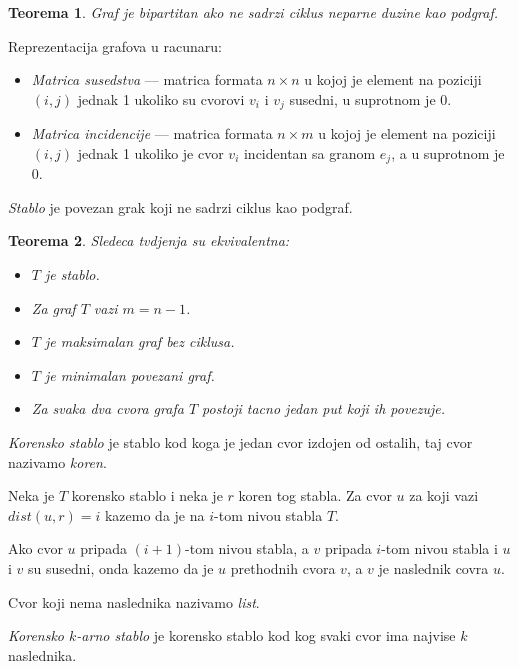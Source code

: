 \documentclass[12p, a4paper]{article}
\newtheorem*{theorem}{Teorema}
\begin{document}
\begin{multicols}{2}
    \begin{theorem}
        Graf je bipartitan ako ne sadrzi ciklus neparne duzine kao podgraf.
    \end{theorem}

    Reprezentacija grafova u racunaru:
    \begin{itemize}
        \itemsep0em
        \item \emph{Matrica susedstva} --- matrica formata $n \times n$ u
              kojoj je element na poziciji $(i, j)$ jednak 1 ukoliko su
              cvorovi $v_i$ i $v_j$ susedni, u suprotnom je 0.
        \item \emph{Matrica incidencije} --- matrica formata $n \times m$ u
              kojoj je element na poziciji $(i, j)$ jednak 1 ukoliko je
              cvor $v_i$ incidentan sa granom $e_j$, a u suprotnom je 0.
    \end{itemize}

    \emph{Stablo} je povezan grak koji ne sadrzi ciklus kao podgraf.

    \begin{theorem}
        Sledeca tvdjenja su ekvivalentna:
        \begin{itemize}
            \itemsep0em
            \item $T$ je stablo.
            \item Za graf $T$ vazi $m = n - 1$.
            \item $T$ je maksimalan graf bez ciklusa.
            \item $T$ je minimalan povezani graf.
            \item Za svaka dva cvora grafa $T$ postoji tacno jedan put koji ih
                  povezuje.
        \end{itemize}
    \end{theorem}

    \emph{Korensko stablo} je stablo kod koga je jedan cvor izdojen od ostalih,
    taj cvor nazivamo \emph{koren}.

    Neka je $T$ korensko stablo i neka je $r$ koren tog stabla. Za cvor $u$
    za koji vazi $dist(u, r) = i$ kazemo da je na $i$-tom nivou stabla $T$.

    Ako cvor $u$ pripada $(i + 1)$-tom nivou stabla, a $v$ pripada $i$-tom
    nivou stabla i $u$ i $v$ su susedni, onda kazemo da je $u$ prethodnih 
    cvora $v$, a $v$ je naslednik covra $u$.

    Cvor koji nema naslednika nazivamo \emph{list}.

    \emph{Korensko $k$-arno stablo} je korensko stablo kod kog svaki cvor
    ima najvise $k$ naslednika.


\end{multicols}
\end{document}
